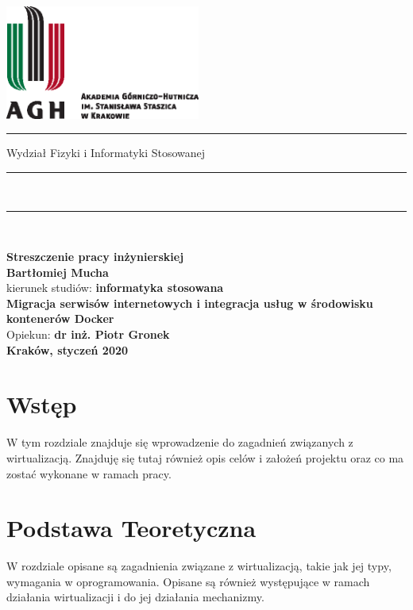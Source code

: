\documentclass[polish, a4paper, 12pt, oneside]{book}
\begin{document}
	
	\begin{titlepage}
		\includegraphics[height=37.5mm]{agh_nzw_a_pl_3w_wbr_cmyk}\\
		\rule{30mm}{0pt}
		{\large\textsf{Wydział Fizyki i Informatyki Stosowanej}}\\
		\rule{\textwidth}{3pt}\\
		\rule[2ex]
		{\textwidth}{1pt}\\
		\vspace{5ex}
		\begin{center}
			{\bf\LARGE\textsf{Streszczenie pracy inżynierskiej}}\\
			\vspace{13ex}
			{\bf\Large\textsf{Bartłomiej Mucha}}\\
			\vspace{3ex}
			{\sf \small kierunek studiów:} {\bf\small\textsf{informatyka stosowana}}\\
			\vspace{7ex}
			{\bf\huge\textsf{Migracja serwisów internetowych i integracja usług w środowisku kontenerów Docker}}\\
			\vspace{14ex}
			{\sf \Large Opiekun:} {\bf\Large\textsf{dr inż. Piotr Gronek}}\\
			\vspace{22ex}
			\textsf{\bf\large\textsf{Kraków, styczeń 2020}}
		\end{center}
	\end{titlepage}
	
	\vspace*{\fill}
	\newpage
	
	\chapter{Wstęp}
	W tym rozdziale znajduje się wprowadzenie do zagadnień związanych z wirtualizacją. Znajduję się tutaj również opis celów i założeń projektu oraz co ma zostać wykonane w ramach pracy.
	
	\chapter{Podstawa Teoretyczna}
	W rozdziale opisane są zagadnienia związane z wirtualizacją, takie jak jej typy, wymagania w oprogramowania. Opisane są również występujące w ramach działania wirtualizacji i do jej działania mechanizmy.
	
\end{document}
